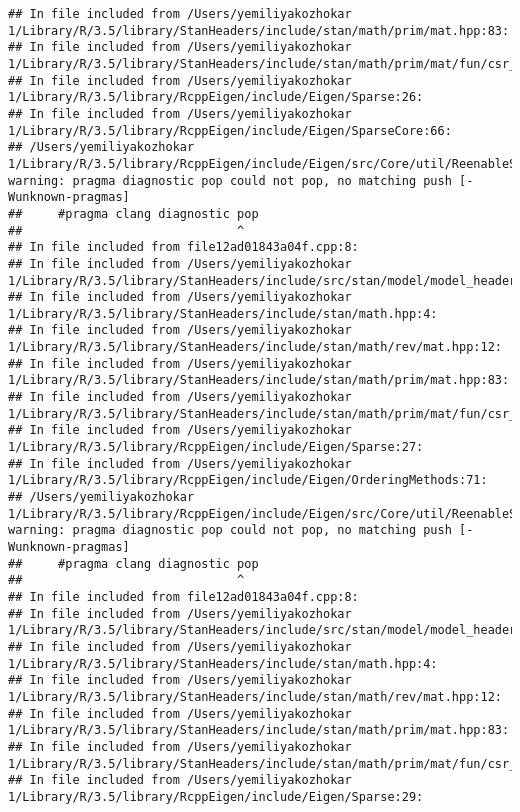 \documentclass[]{article}
\begin{document}
\begin{verbatim}
## In file included from /Users/yemiliyakozhokar 1/Library/R/3.5/library/StanHeaders/include/stan/math/prim/mat.hpp:83:
## In file included from /Users/yemiliyakozhokar 1/Library/R/3.5/library/StanHeaders/include/stan/math/prim/mat/fun/csr_extract_u.hpp:6:
## In file included from /Users/yemiliyakozhokar 1/Library/R/3.5/library/RcppEigen/include/Eigen/Sparse:26:
## In file included from /Users/yemiliyakozhokar 1/Library/R/3.5/library/RcppEigen/include/Eigen/SparseCore:66:
## /Users/yemiliyakozhokar 1/Library/R/3.5/library/RcppEigen/include/Eigen/src/Core/util/ReenableStupidWarnings.h:10:30: warning: pragma diagnostic pop could not pop, no matching push [-Wunknown-pragmas]
##     #pragma clang diagnostic pop
##                              ^
## In file included from file12ad01843a04f.cpp:8:
## In file included from /Users/yemiliyakozhokar 1/Library/R/3.5/library/StanHeaders/include/src/stan/model/model_header.hpp:4:
## In file included from /Users/yemiliyakozhokar 1/Library/R/3.5/library/StanHeaders/include/stan/math.hpp:4:
## In file included from /Users/yemiliyakozhokar 1/Library/R/3.5/library/StanHeaders/include/stan/math/rev/mat.hpp:12:
## In file included from /Users/yemiliyakozhokar 1/Library/R/3.5/library/StanHeaders/include/stan/math/prim/mat.hpp:83:
## In file included from /Users/yemiliyakozhokar 1/Library/R/3.5/library/StanHeaders/include/stan/math/prim/mat/fun/csr_extract_u.hpp:6:
## In file included from /Users/yemiliyakozhokar 1/Library/R/3.5/library/RcppEigen/include/Eigen/Sparse:27:
## In file included from /Users/yemiliyakozhokar 1/Library/R/3.5/library/RcppEigen/include/Eigen/OrderingMethods:71:
## /Users/yemiliyakozhokar 1/Library/R/3.5/library/RcppEigen/include/Eigen/src/Core/util/ReenableStupidWarnings.h:10:30: warning: pragma diagnostic pop could not pop, no matching push [-Wunknown-pragmas]
##     #pragma clang diagnostic pop
##                              ^
## In file included from file12ad01843a04f.cpp:8:
## In file included from /Users/yemiliyakozhokar 1/Library/R/3.5/library/StanHeaders/include/src/stan/model/model_header.hpp:4:
## In file included from /Users/yemiliyakozhokar 1/Library/R/3.5/library/StanHeaders/include/stan/math.hpp:4:
## In file included from /Users/yemiliyakozhokar 1/Library/R/3.5/library/StanHeaders/include/stan/math/rev/mat.hpp:12:
## In file included from /Users/yemiliyakozhokar 1/Library/R/3.5/library/StanHeaders/include/stan/math/prim/mat.hpp:83:
## In file included from /Users/yemiliyakozhokar 1/Library/R/3.5/library/StanHeaders/include/stan/math/prim/mat/fun/csr_extract_u.hpp:6:
## In file included from /Users/yemiliyakozhokar 1/Library/R/3.5/library/RcppEigen/include/Eigen/Sparse:29:

\end{verbatim}
\end{document}
